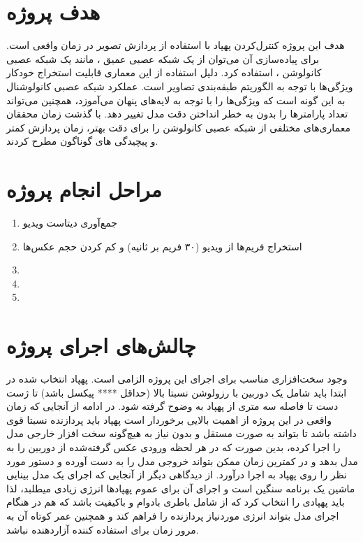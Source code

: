 \section{هدف پروژه}
هدف این پروژه کنترل‌کردن پهپاد با استفاده از پردازش تصویر در زمان واقعی است. برای پیاده‌سازی آن می‌توان از یک شبکه عصبی عمیق 
، مانند یک شبکه عصبی کانولوشن  ، استفاده کرد. دلیل استفاده از این معماری قابلیت استخراج خودکار ویژگی‌ها با توجه به الگوریتم طبقه‌بندی تصاویر
است. عملکرد شبکه عصبی کانولوشنال به این گونه است که ویژگی‌ها را با توجه به لایه‌های پنهان می‌آموزد، همچنین می‌تواند تعداد پارامترها را بدون به خطر انداختن دقت مدل تغییر دهد. با گذشت زمان محققان 
معماری‌های مختلفی از شبکه عصبی کانولوشن را برای دقت بهتر، زمان پردازش کمتر و پیچیدگی های  گوناگون مطرح کردند. 

\section{مراحل انجام پروژه}
\begin{enumerate}
    \item  {جمع‌آوری دیتاست ویدیو}
    \item  {استخراج فریم‌ها از ویدیو (۳۰ فریم بر ثانیه) و کم کردن حجم عکس‌ها}
    \item  {}
    \item  {}
    \item  {}
\end{enumerate}

\section{چالش‌های اجرای پروژه}
وجود سخت‌افزاری مناسب برای اجرای این پروژه الزامی است. پهپاد انتخاب شده در ابتدا باید شامل یک دوربین با رزولوشن نسبتا بالا (حداقل **** پیکسل باشد) تا  ژست دست تا فاصله سه متری از پهپاد به وضوح گرفته شود.
در ادامه از آنجایی که زمان واقعی در این پروژه از اهمیت بالایی برخوردار است پهپاد باید پردازنده نسبتا قوی داشته باشد تا بتواند به صورت مستقل و بدون نیاز به هیچ‌گونه سخت افزار خارجی مدل را اجرا کرده، 
بدین صورت که در هر لحظه ورودی عکس گرفته‌شده از دوربین را به مدل بدهد و در کمترین زمان ممکن بتواند خروجی مدل را به دست آورده و دستور مورد نظر را روی 
پهپاد به اجرا درآورد. از دیدگاهی دیگر از آنجایی که اجرای یک مدل بینایی ماشین یک برنامه سنگین است و اجرای آن برای عموم پهپاد‌ها انرژی زیادی میطلبد، لذا باید پهپادی را انتخاب کرد
که از شامل باطری بادوام و باکیفیت باشد که هم در هنگام اجرای مدل بتواند انرژی مورد‌نیاز پردازنده را فراهم کند و همچنین عمر کوتاه آن به مرور زمان برای استفاده کننده آزاردهنده نباشد.

 




